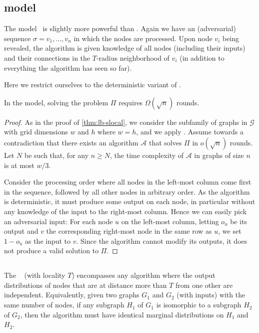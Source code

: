 \documentclass[11pt]{article}
\begin{document}
\subsection{\Detolcl model}\label{sec:detolcl}

The \onlinelocal model~\cite{akbari23_locality_icalp} is slightly more
powerful than \slocal. Again we have an (adversarial) sequence $\sigma =
v_1,\dots,v_n$ in which the nodes are processed. Upon node $v_i$ being revealed,
the algorithm is given knowledge of all nodes (including their inputs) and their
connections in the $T$-radius neighborhood of $v_i$ (in addition to everything
the algorithm has seen so far).

Here we restrict ourselves to the deterministic variant of \onlinelocal.

\begin{theorem}\label{thm:lb-detolcl}
	In the \detolcl model, solving the problem $\Pi$ requires $\Omega(\sqrt{n})$
	rounds.
\end{theorem}
\begin{proof}
	As in the proof of \cref{thm:lb-slocal}, we consider the subfamily of graphs
	in $\mathcal{G}$ with grid dimensions $w$ and $h$ where $w = h$, and we apply
	. 
	Assume towards a contradiction that there exists an algorithm $\mathcal{A}$
	that solves $\Pi$ in $o(\sqrt{n})$ rounds. 
	Let $N$ be such that, for any $n\ge N$, the time complexity of $\mathcal{A}$
	in graphs of size $n$ is at most $w/3$.
	
	Consider the processing order where all nodes in the left-most column come
	first in the sequence, followed by all other nodes in arbitrary order.
	As the algorithm is deterministic, it must produce some output on each node,
	in particular without any knowledge of the input to the right-most column.
	Hence we can easily pick an adversarial input:
	For each node $u$ on the left-most column, letting $o_u$ be its output and $v$
	the corresponding right-most node in the same row as $u$, we set $1-o_u$ as
	the input to $v$.
	Since the algorithm cannot modify its outputs, it does not produce a valid
	solution to $\Pi$.
\end{proof}


\subsection{\Boundep}\label{sec:boundep}

The \boundep~\cite{akbari24_online_arxiv} (with locality $T$)
encompasses any algorithm where the output distributions of nodes that are at
distance more than $T$ from one other are independent.
Equivalently, given two graphs $G_1$ and $G_2$ (with inputs) with the same
number of nodes, if any subgraph $H_1$ of $G_1$ is isomorphic to a subgraph
$H_2$ of $G_2$, then the algorithm must have identical marginal distributions on
$H_1$ and $H_2$.
\end{document}
